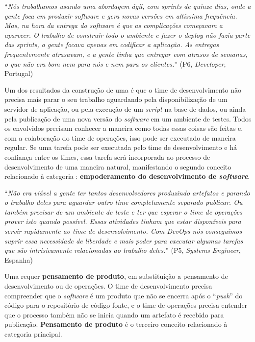 \begin{mq}
``\emph{Nós trabalhamos usando uma abordagem ágil, com {\it sprints} de quinze
dias, onde a gente foca em produzir {\it software} e gera novas versões em
altíssima frequência. Mas, na hora da entrega do {\it software} é que as
complicações começavam a aparecer. O trabalho de construir todo o ambiente
e fazer o {\it deploy} não fazia parte das {\it sprints}, a gente focava apenas
em codificar a aplicação. As entregas frequentemente atrasavam,
e a gente tinha que entregar com atrasos de semanas, o que não era bom nem para
nós e nem para os clientes.}'' (P6, {\it Developer}, Portugal)
\end{mq}

Um dos resultados da construção de uma \cc é que o time de desenvolvimento não
precisa mais parar o seu trabalho aguardando pela disponibilização de um
servidor de aplicação, ou pela execução de um {\it script} na base de dados, ou
ainda pela publicação de uma nova versão do {\it software} em um ambiente de
testes. Todos os envolvidos precisam conhecer a maneira como todas essas coisas
são feitas e, com a colaboração do time de operações, isso pode ser executado
de maneira regular. Se uma tarefa pode ser executada pelo time de desenvolvimento
e há confiança entre os times, essa tarefa será incorporada ao processo de
desenvolvimento de uma maneira natural, manifestando o segundo conceito
relacionado à categoria \cc: {\bf empoderamento do desenvolvimento de \emph{software}}.

\begin{mq}
``\emph{Não era viável a gente ter tantos desenvolvedores produzindo artefatos e
parando o trabalho deles para aguardar outro time completamente separado
publicar. Ou também precisar de um ambiente de teste e ter que esperar o time
de operações prover isto quando possível. Essas atividades tinham que estar
disponíveis para servir rapidamente ao time de desenvolvimento. Com DevOps
nós conseguimos suprir essa necessidade de liberdade e mais poder para executar
algumas tarefas que são intrisicamente relacionadas ao trabalho deles.}''
(P5, {\it Systems Engineer}, Espanha)
\end{mq}

Uma \cc requer {\bf pensamento de produto}, em substituição a pensamento de
desenvolvimento ou de operações. O time de desenvolvimento precisa compreender
que o {\it software} é um produto que não se encerra após o ``{\it push}'' do código
para o repositório de código-fonte, e o time de operações precisa entender que
o processo também não se inicia quando um artefato é recebido para publicação.
{\bf Pensamento de produto} é o terceiro conceito relacionado à categoria
principal.

